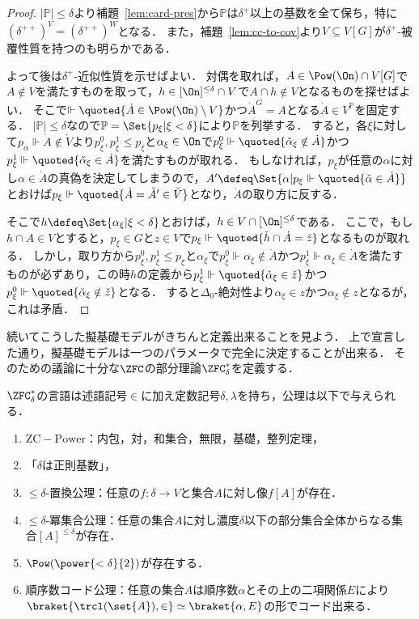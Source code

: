 \documentclass[a4j,leqno]{ltjsarticle}
\theoremstyle{nonumberplain}
\begin{document}
\begin{proof}
 $|\mathbb{P}| \leq \delta$より補題~\ref{lem:card-pres}から$\mathbb{P}$は$\delta^+$以上の基数を全て保ち，特に$(\delta^{++})^V = (\delta^{++})^W$となる．
 また，補題~\ref{lem:cc-to-cov}より$V \subseteq V[G]$が$\delta^+$-被覆性質を持つのも明らかである．

 よって後は$\delta^+$-近似性質を示せばよい．
 対偶を取れば，$A \in \Pow(\On) \cap V[G]$で$A \notin V$を満たすものを取って，$h \in [\On]^{\leq \delta} \cap V$で$A \cap h \notin V$となるものを探せばよい．
 そこで$\Vdash \quoted{\dot{A} \in \Pow(\On) \setminus V}$かつ$\dot{A}^G = A$となる$\dot{A} \in V^{\mathbb{P}}$を固定する．
 $|\mathbb{P}| \leq \delta$なので$\mathbb{P} = \Set{p_\xi | \xi < \delta}$により$\mathbb{P}$を列挙する．
 すると，各$\xi$に対して$p_\alpha \Vdash \dot{A} \notin \check{V}$より$p_\xi^0, p_\xi^1 \leq p_\xi$と$\alpha_\xi \in \On$で$p_\xi^0 \Vdash\quoted{ \check{\alpha}_\xi \notin \dot{A}}$かつ$p_\xi^1 \Vdash \quoted{\check{\alpha}_\xi \in \dot{A}}$を満たすものが取れる．
 もしなければ，$p_\xi$が任意の$\alpha$に対し$\alpha \in \dot{A}$の真偽を決定してしまうので，$A' \defeq \Set{ \alpha | p_\xi \Vdash \quoted{\check{\alpha} \in \dot{A}}}$とおけば$p_\xi \Vdash \quoted{\dot{A} = \check{A}' \in \check{V}}$となり，$\dot{A}$の取り方に反する．

 そこで$h \defeq \Set{\alpha_\xi | \xi < \delta}$とおけば，$h \in V \cap [\On]^{\leq \delta}$である．
 ここで，もし$h \cap A \in V$とすると，$p_\xi \in G$と$z \in V$で$p_\xi \Vdash \quoted{\check{h} \cap \dot{A} = \check{z}}$となるものが取れる．
 しかし，取り方から$p_\xi^0, p_\xi^1 \leq p_\xi$と$\alpha_\xi$で$p_\xi^0 \Vdash \alpha_\xi \notin \dot{A}$かつ$p_\xi^1 \Vdash \alpha_\xi \in \dot{A}$を満たすものが必ずあり，この時$h$の定義から$p_\xi^1 \Vdash \quoted{\check{\alpha}_\xi \in \check{z}}$かつ$p_\xi^0 \Vdash \quoted{\check{\alpha}_\xi \notin \check{z}}$となる．
 すると$\Delta_0$-絶対性より$\alpha_\xi \in z$かつ$\alpha_\xi \notin z$となるが，これは矛盾．
\end{proof}
続いてこうした擬基礎モデルがきちんと定義出来ることを見よう．
上で宣言した通り，擬基礎モデルは一つのパラメータで完全に決定することが出来る．
そのための議論に十分な$\ZFC$の部分理論$\ZFC_\delta^*$を定義する．
\begin{definition}[$\ZFC_\delta^*$]
 $\ZFC_\delta^*$の言語は述語記号$\in$に加え定数記号$\delta, \lambda$を持ち，公理は以下で与えられる．
 \begin{enumerate}
  \item $\mathrm{ZC}-\mathrm{Power}$：内包，対，和集合，無限，基礎，整列定理，
  \item 「$\delta$は正則基数」，
  \item ${\leq}\delta$-置換公理：任意の$f: \delta \to V$と集合$A$に対し像$f[A]$が存在．
  \item ${\leq}\delta$-冪集合公理：任意の集合$A$に対し濃度$\delta$以下の部分集合全体からなる集合$[A]^{\leq\delta}$が存在．
  \item $\Pow(\power{<\delta}{2})$が存在する．
  \item 順序数コード公理：任意の集合$A$は順序数$\alpha$とその上の二項関係$E$により$\braket{\trcl(\set{A}), {\in}} \simeq \braket{\alpha, E}$の形でコード出来る．
 \end{enumerate}
\end{definition}
\end{document}
